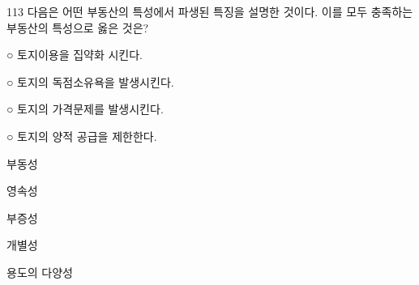 \begin{question}{113}
다음은 어떤 부동산의 특성에서 파생된 특징을 설명한 것이다. 이를 모두 충족하는 부동산의 특성으로 옳은 것은?
\begin{framedtext}
○ 토지이용을 집약화 시킨다. \par
○ 토지의 독점소유욕을 발생시킨다. \par
○ 토지의 가격문제를 발생시킨다. \par
○ 토지의 양적 공급을 제한한다. \par
\end{framedtext}
\begin{choices}
  \item 부동성
  \item 영속성
  \item 부증성
  \item 개별성
  \item 용도의 다양성
\end{choices}
\end{question}
